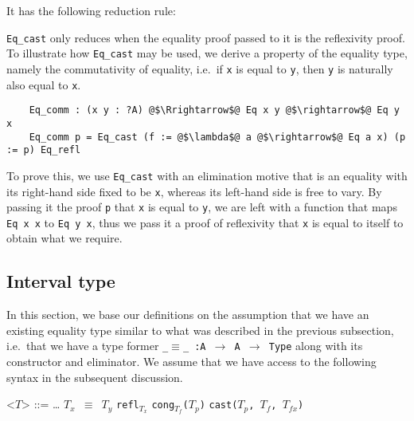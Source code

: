 \documentclass[12pt,twoside,maitrise]{dms}
\theoremstyle{definition}
\numberwithin{equation}{section}
\numberwithin{table}{chapter}
\numberwithin{figure}{chapter}
\newcommand\kw[1] {\textsf{#1}}
\newcommand\id[1] {\texttt{#1}}
\newcommand\fn[1] {\texttt{#1}}
\begin{document}
It has the following reduction rule:

\begin{prooftree*}
  \hypo{\id{p} \simeq{} \id{Eq\_refl}}
  \infer1{\Funapp{\id{Eq\_cast}}{\id{x}}{\id{y}}{\id{p}}{\id{f}}{\id{fx}} \rightsquigarrow{} \id{fx}}
\end{prooftree*}

\id{Eq\_cast} only reduces when the equality proof passed to it is the
reflexivity proof. To illustrate how \id{Eq\_cast} may be used, we derive a
property of the equality type, namely the commutativity of equality, i.e.\ if
\id{x} is equal to \id{y}, then \id{y} is naturally also equal to \id{x}.

\begin{verbatim}
    Eq_comm : (x y : ?A) @$\Rrightarrow$@ Eq x y @$\rightarrow$@ Eq y x
    Eq_comm p = Eq_cast (f := @$\lambda$@ a @$\rightarrow$@ Eq a x) (p := p) Eq_refl
\end{verbatim}

To prove this, we use \id{Eq\_cast} with an elimination motive that is an
equality with its right-hand side fixed to be \id{x}, whereas its left-hand side
is free to vary. By passing it the proof \id{p} that \id{x} is equal to \id{y},
we are left with a function that maps \fn{Eq x x} to \fn{Eq y x}, thus we pass
it a proof of reflexivity that \id{x} is equal to itself to obtain what we
require.

\subsection{Interval type}\label{sec:interval-introduction}

In this section, we base our definitions on the assumption that we have an
existing equality type similar to what was described in the previous subsection,
i.e.\ that we have a type former \fn{\_$\equiv$\_ :\@ A $\rightarrow$ A
  $\rightarrow$ Type} along with its constructor and eliminator. We assume that
we have access to the following syntax in the subsequent discussion.

\setlength{\grammarparsep}{20pt plus 1pt minus 1pt} %
\setlength{\grammarindent}{4em} %

\renewcommand{\syntleft}{}
\renewcommand{\syntright}{}
\begin{grammar}
<$T$> ::= \ldots
\alt{} \fn{$T_{x}$ $\equiv$ $T_{y}$}
\alt{} \fn{\kw{refl}$_{T_x}$}
\alt{} \fn{\kw{cong}$_{T_f}$(${T_p}$)}
\alt{} \fn{\kw{cast}($T_{p}$, $T_{f}$, $T_{fx}$)}
\end{grammar}
\end{document}
